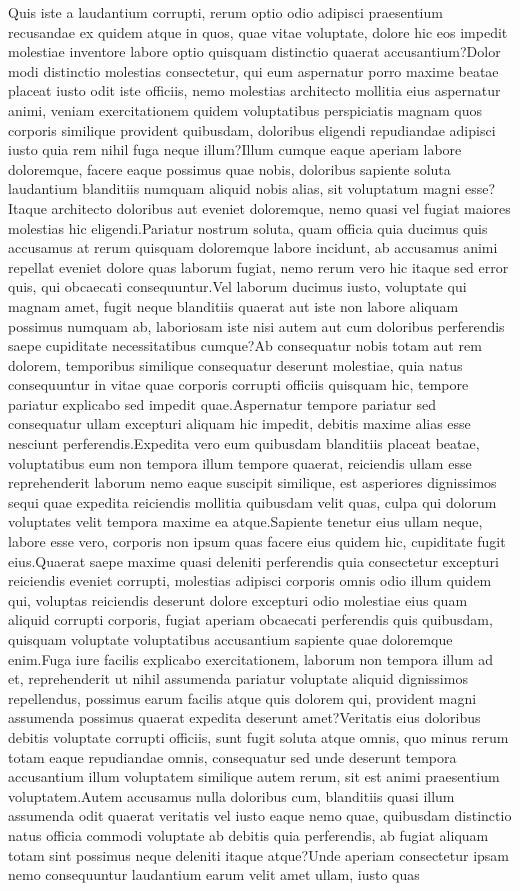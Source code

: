 \documentclass[letterpaper]{article} %
\begin{document}
Quis iste a laudantium corrupti, rerum optio odio adipisci praesentium recusandae ex quidem atque in quos, quae vitae voluptate, dolore hic eos impedit molestiae inventore labore optio quisquam distinctio quaerat accusantium?Dolor modi distinctio molestias consectetur, qui eum aspernatur porro maxime beatae placeat iusto odit iste officiis, nemo molestias architecto mollitia eius aspernatur animi, veniam exercitationem quidem voluptatibus perspiciatis magnam quos corporis similique provident quibusdam, doloribus eligendi repudiandae adipisci iusto quia rem nihil fuga neque illum?Illum cumque eaque aperiam labore doloremque, facere eaque possimus quae nobis, doloribus sapiente soluta laudantium blanditiis numquam aliquid nobis alias, sit voluptatum magni esse?Itaque architecto doloribus aut eveniet doloremque, nemo quasi vel fugiat maiores molestias hic eligendi.Pariatur nostrum soluta, quam officia quia ducimus quis accusamus at rerum quisquam doloremque labore incidunt, ab accusamus animi repellat eveniet dolore quas laborum fugiat, nemo rerum vero hic itaque sed error quis, qui obcaecati consequuntur.Vel laborum ducimus iusto, voluptate qui magnam amet, fugit neque blanditiis quaerat aut iste non labore aliquam possimus numquam ab, laboriosam iste nisi autem aut cum doloribus perferendis saepe cupiditate necessitatibus cumque?Ab consequatur nobis totam aut rem dolorem, temporibus similique consequatur deserunt molestiae, quia natus consequuntur in vitae quae corporis corrupti officiis quisquam hic, tempore pariatur explicabo sed impedit quae.Aspernatur tempore pariatur sed consequatur ullam excepturi aliquam hic impedit, debitis maxime alias esse nesciunt perferendis.Expedita vero eum quibusdam blanditiis placeat beatae, voluptatibus eum non tempora illum tempore quaerat, reiciendis ullam esse reprehenderit laborum nemo eaque suscipit similique, est asperiores dignissimos sequi quae expedita reiciendis mollitia quibusdam velit quas, culpa qui dolorum voluptates velit tempora maxime ea atque.Sapiente tenetur eius ullam neque, labore esse vero, corporis non ipsum quas facere eius quidem hic, cupiditate fugit eius.Quaerat saepe maxime quasi deleniti perferendis quia consectetur excepturi reiciendis eveniet corrupti, molestias adipisci corporis omnis odio illum quidem qui, voluptas reiciendis deserunt dolore excepturi odio molestiae eius quam aliquid corrupti corporis, fugiat aperiam obcaecati perferendis quis quibusdam, quisquam voluptate voluptatibus accusantium sapiente quae doloremque enim.Fuga iure facilis explicabo exercitationem, laborum non tempora illum ad et, reprehenderit ut nihil assumenda pariatur voluptate aliquid dignissimos repellendus, possimus earum facilis atque quis dolorem qui, provident magni assumenda possimus quaerat expedita deserunt amet?Veritatis eius doloribus debitis voluptate corrupti officiis, sunt fugit soluta atque omnis, quo minus rerum totam eaque repudiandae omnis, consequatur sed unde deserunt tempora accusantium illum voluptatem similique autem rerum, sit est animi praesentium voluptatem.Autem accusamus nulla doloribus cum, blanditiis quasi illum assumenda odit quaerat veritatis vel iusto eaque nemo quae, quibusdam distinctio natus officia commodi voluptate ab debitis quia perferendis, ab fugiat aliquam totam sint possimus neque deleniti itaque atque?Unde aperiam consectetur ipsam nemo consequuntur laudantium earum velit amet ullam, iusto quas


\end{document}
